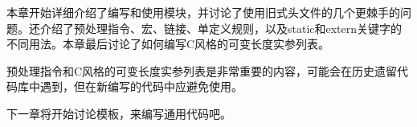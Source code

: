 本章开始详细介绍了编写和使用模块，并讨论了使用旧式头文件的几个更棘手的问题。还介绍了预处理指令、宏、链接、单定义规则，以及static和extern关键字的不同用法。本章最后讨论了如何编写C风格的可变长度实参列表。

预处理指令和C风格的可变长度实参列表是非常重要的内容，可能会在历史遗留代码库中遇到，但在新编写的代码中应避免使用。

下一章将开始讨论模板，来编写通用代码吧。
